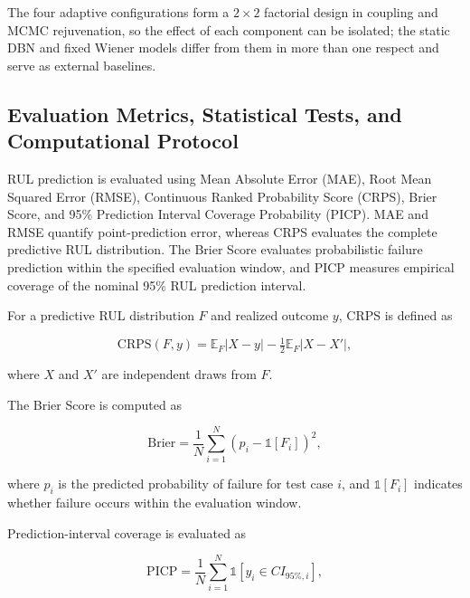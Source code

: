 \documentclass[journal]{IEEEtran}
\begin{document}
The four adaptive configurations form a $2\times2$ factorial design in
coupling and MCMC rejuvenation, so the effect of each component can be
isolated; the static DBN and fixed Wiener models differ from them in
more than one respect and serve as external baselines.



\subsection{Evaluation Metrics, Statistical Tests, and Computational Protocol}
\label{sec:metrics}

RUL prediction is evaluated using Mean Absolute Error (MAE), Root Mean
Squared Error (RMSE), Continuous Ranked Probability Score (CRPS),
Brier Score, and 95\% Prediction Interval Coverage Probability (PICP).
MAE and RMSE quantify point-prediction error, whereas CRPS evaluates
the complete predictive RUL distribution. The Brier Score evaluates
probabilistic failure prediction within the specified evaluation
window, and PICP measures empirical coverage of the nominal 95\%
RUL prediction interval.

For a predictive RUL distribution $F$ and realized outcome $y$, CRPS
is defined as

\begin{equation}
\mathrm{CRPS}(F,y)
=
\mathbb{E}_F|X-y|
-
\tfrac{1}{2}\mathbb{E}_F|X-X'|,
\label{eq:crps}
\end{equation}

where $X$ and $X'$ are independent draws from $F$.

The Brier Score is computed as

\begin{equation}
\mathrm{Brier}
=
\frac{1}{N}
\sum_{i=1}^{N}
\left(
p_i-\mathbb{1}[F_i]
\right)^2,
\label{eq:brier}
\end{equation}

where $p_i$ is the predicted probability of failure for test case
$i$, and $\mathbb{1}[F_i]$ indicates whether failure occurs within the
evaluation window.

Prediction-interval coverage is evaluated as

\begin{equation}
\mathrm{PICP}
=
\frac{1}{N}
\sum_{i=1}^{N}
\mathbb{1}
\left[
y_i\in CI_{95\%,i}
\right],
\label{eq:picp}
\end{equation}
\end{document}
